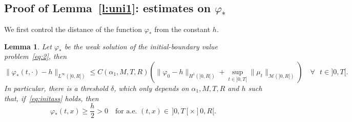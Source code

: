 \documentclass[11pt,leqno]{amsart}
\newtheorem{lemma}[theorem]{Lemma}
\numberwithin{equation}{section}
\begin{document}
\subsection{Proof of Lemma~\ref{l:uni1}: estimates on ${\varphi}_\ast$}
\label{ss:fhiast}
We first control the distance of the function ${\varphi}_\ast$ from the constant $h$. 
\begin{lemma}
\label{l:fiast}
Let ${\varphi}_\ast$ be the weak solution of the initial-boundary 
value problem~\eqref{eq:2}, then \begin{equation}
\label{e:inftyast}
     \| {\varphi}_\ast (t, \cdot) - h \|_{L^\infty (]0, R[)} \leq 
     C(\alpha_1, M, T, R ) \left( \| {\varphi}_0 - h \|_{H^1 (]0, R[)}  + 
     \sup_{t \in ]0, T[} \| \mu_t \|_{\mathcal M (]0, R[)} \right) 
     \quad \forall\text{ $t \in ]0, T[$.}
\end{equation}
In particular, there is a threshold $\delta$, which only depends on $\alpha_1, M, T, R$ and $h$ such that, if~\eqref{eq:initass}  holds, then 
\begin{equation}
\label{e:grande}
    {\varphi}_\ast (t, x) \ge \frac{h}{2} >0 \quad 
    \text{for a.e. $(t, x) \in \, ]0, T[ \times ]0, R[$}. 
\end{equation}
\end{lemma}
\end{document}
